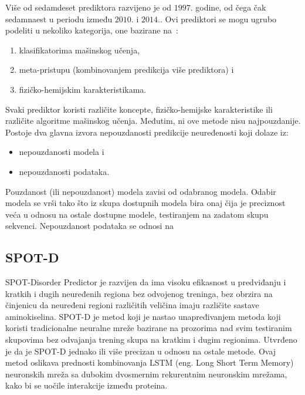 Više od sedamdeset prediktora razvijeno je od $1997.$ godine, od čega čak sedamnaest u periodu između $2010.$ i $2014.$. Ovi prediktori se mogu ugrubo podeliti u nekoliko kategorija, one bazirane na~\cite{PredictorsOverview}:
\begin{enumerate}
\item klasifikatorima mašinskog učenja,
\item meta-pristupu (kombinovanjem predikcija više prediktora) i 
\item fizičko-hemijskim karakteristikama.
\end{enumerate}

Svaki prediktor koristi različite koncepte, fizičko-hemijske karakteristike ili različite algoritme mašinskog učenja. Međutim, ni ove metode nisu najpouzdanije. Postoje dva glavna izvora nepouzdanosti predikcije neuređenosti koji dolaze iz:
\begin{itemize}
\item nepouzdanosti modela i
\item nepouzdanosti podataka.
\end{itemize}

Pouzdanost (ili nepouzdanost) modela zavisi od odabranog modela. Odabir modela se vrši tako što iz skupa dostupnih modela bira onaj čija je preciznost veća u odnosu na ostale dostupne modele, testiranjem na zadatom skupu sekvenci.
Nepouzdanost podataka se odnosi na  ~\cite{MolBioSyst}


\subsection{SPOT-D}

SPOT-Disorder Predictor je razvijen da ima visoku efikasnost u predviđanju i kratkih i dugih neuređenih regiona bez odvojenog treninga, bez obrzira na činjenicu da neuređeni regioni različitih veličina imaju različite sastave aminokiselina. SPOT-D je metod koji je nastao unapređivanjem metoda koji koristi tradicionalne neuralne mreže bazirane na prozorima nad svim testiranim skupovima bez odvajanja trening skupa na kratkim i dugim regionima. Utvrđeno je da je SPOT-D jednako ili više precizan u odnosu na ostale metode. Ovaj metod oslikava prednosti kombinovanja LSTM (eng. Long Short Term Memory) neuronskih mreža sa dubokim dvosmernim rekurentnim neuronskim mrežama, kako bi se uočile interakcije između proteina.
~\cite{SPOTD}



